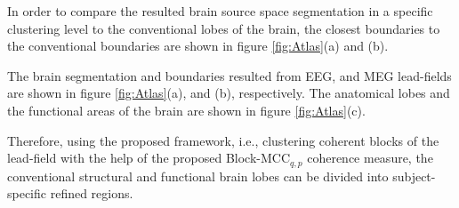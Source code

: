 In order to compare the resulted brain source space segmentation in a specific clustering level to the conventional lobes of the brain, the closest boundaries to the conventional boundaries are shown in figure \ref{fig:Atlas}(a) and (b).

The brain segmentation and boundaries resulted from EEG, and MEG lead-fields are shown in figure \ref{fig:Atlas}(a), and (b), respectively.
The anatomical lobes and the functional areas of the brain are shown in figure \ref{fig:Atlas}(c).

Therefore, using the proposed framework, i.e., clustering coherent blocks of the lead-field with the help of the proposed Block-MCC$_{q,p}$ coherence measure, the conventional structural and functional brain lobes can be divided into subject-specific refined regions.

\FloatBarrier